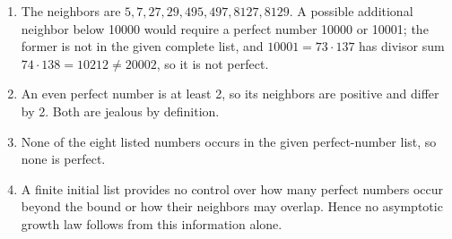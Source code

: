 \begin{enumerate}\item The neighbors are $\boxed{5,7,27,29,495,497,8127,8129}$. A possible additional neighbor below 10000 would require a perfect number 10000 or 10001; the former is not in the given complete list, and $10001=73\cdot 137$ has divisor sum $74\cdot 138=10212\ne 20002$, so it is not perfect.\item An even perfect number is at least 2, so its neighbors are positive and differ by 2. Both are jealous by definition.\item None of the eight listed numbers occurs in the given perfect-number list, so none is perfect.\item A finite initial list provides no control over how many perfect numbers occur beyond the bound or how their neighbors may overlap. Hence no asymptotic growth law follows from this information alone.\end{enumerate}
